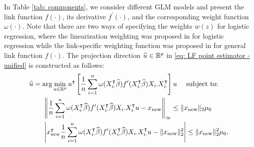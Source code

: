 \begin{table}[ht]
    \centering
    \caption{Definitions of the functions $\omega$ and $f$ for different GLMs.}
    \label{tab: components}
\end{table}
In Table \ref{tab: components}, we consider different GLM models and present the link function $f(\cdot)$, its derivative $f^\prime (\cdot)$, and the corresponding weight function $\omega(\cdot)$.  Note that there are two ways of specifying the weights $w(z)$ for logistic regression, where the linearization weighting was proposed in \citet{guo2021group} for logistic regression while the link-specific weighting function was proposed in   \citet{cai2021statistical} for general link function $f(\cdot)$.
\noindent
The projection direction $\widehat{u} \in \mathbb{R}^p$ in \eqref{eq: LF point estimator - unified} is constructed as follows:
\begin{equation}
    \begin{aligned}
        &\widehat{u} = \arg\min_{u \in \mathbb{R}^p} u^\intercal \left[\frac{1}{n}\sum_{i=1}^n \omega(X_{i\cdot}^\intercal \widehat{\beta}) f^\prime (X_{i\cdot}^\intercal \widehat{\beta}) X_{i\cdot} X_{i\cdot}^\intercal \right] u \quad \textrm{ subject to: } \\
    &\quad \quad \left\|\frac{1}{n} \sum_{i=1}^n \omega(X_{i\cdot}^\intercal \widehat{\beta}) f^\prime(X_{i\cdot}^\intercal \widehat{\beta}) X_{i\cdot} X_{i\cdot}^\intercal u - x_{\rm new} \right\|_\infty \leq \|x_{\rm new}\|_2 \mu_0 \\
    &\quad \quad \left|x_{\rm new}^\intercal \frac{1}{n} \sum_{i=1}^n \omega(X_{i\cdot}^\intercal \widehat{\beta}) f^\prime(X_{i\cdot}^\intercal \widehat{\beta}) X_{i\cdot} X_{i\cdot}^\intercal u - \|x_{\rm new}\|^2_2 \right| \leq \|x_{\rm new}\|_2^2 \mu_0.
    \end{aligned}
    \label{eq: projection}
\end{equation}
